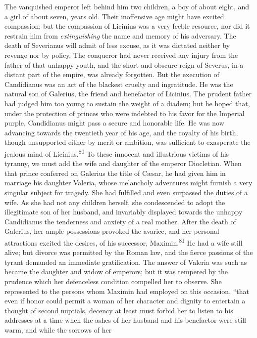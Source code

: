 The vanquished emperor left behind him two children, a boy of
about eight, and a girl of about seven, years old. Their
inoffensive age might have excited compassion; but the compassion
of Licinius was a very feeble resource, nor did it restrain him
from \textit{extinguishing} the name and memory of his adversary. The
death of Severianus will admit of less excuse, as it was dictated
neither by revenge nor by policy. The conqueror had never
received any injury from the father of that unhappy youth, and
the short and obscure reign of Severus, in a distant part of the
empire, was already forgotten. But the execution of Candidianus
was an act of the blackest cruelty and ingratitude. He was the
natural son of Galerius, the friend and benefactor of Licinius.
The prudent father had judged him too young to sustain the weight
of a diadem; but he hoped that, under the protection of princes
who were indebted to his favor for the Imperial purple,
Candidianus might pass a secure and honorable life. He was now
advancing towards the twentieth year of his age, and the royalty
of his birth, though unsupported either by merit or ambition, was
sufficient to exasperate the jealous mind of Licinius.\textsuperscript{80} To
these innocent and illustrious victims of his tyranny, we must
add the wife and daughter of the emperor Diocletian. When that
prince conferred on Galerius the title of Cæsar, he had given him
in marriage his daughter Valeria, whose melancholy adventures
might furnish a very singular subject for tragedy. She had
fulfilled and even surpassed the duties of a wife. As she had not
any children herself, she condescended to adopt the illegitimate
son of her husband, and invariably displayed towards the unhappy
Candidianus the tenderness and anxiety of a real mother. After
the death of Galerius, her ample possessions provoked the
avarice, and her personal attractions excited the desires, of his
successor, Maximin.\textsuperscript{81} He had a wife still alive; but divorce was
permitted by the Roman law, and the fierce passions of the tyrant
demanded an immediate gratification. The answer of Valeria was
such as became the daughter and widow of emperors; but it was
tempered by the prudence which her defenceless condition
compelled her to observe. She represented to the persons whom
Maximin had employed on this occasion, “that even if honor could
permit a woman of her character and dignity to entertain a
thought of second nuptials, decency at least must forbid her to
listen to his addresses at a time when the ashes of her husband
and his benefactor were still warm, and while the sorrows of her
